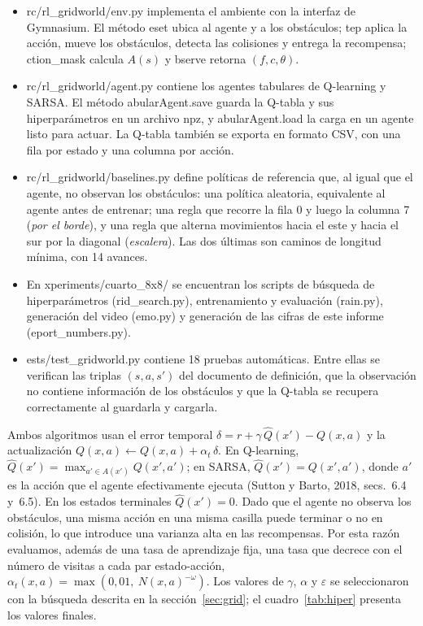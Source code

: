 \documentclass[11pt,letterpaper]{article}
\makeatletter
\newcommand{\code}[1]{{\ttfamily\codebreaks#1\endcodebreaks}}
\def\codebreaks#1\endcodebreaks{\@codebreaks#1\@nil}
\def\@codebreaks#1{\ifx#1\@nil\else\ifx#1/\slash\else\ifx#1\_\_\allowbreak\else#1\fi\fi\expandafter\@codebreaks\fi}
\makeatother
\begin{document}
\begin{itemize}
  \item \code{src/rl\_gridworld/env.py} implementa el ambiente con la interfaz de Gymnasium. El método
    \code{reset} ubica al agente y a los obstáculos; \code{step} aplica la acción, mueve los obstáculos, detecta
    las colisiones y entrega la recompensa; \code{action\_mask} calcula $A(s)$ y \code{observe} retorna
    $(f,c,\theta)$.
  \item \code{src/rl\_gridworld/agent.py} contiene los agentes tabulares de Q-learning y SARSA. El método
    \code{TabularAgent.save} guarda la Q-tabla y sus hiperparámetros en un archivo \code{.npz}, y
    \code{TabularAgent.load} la carga en un agente listo para actuar. La Q-tabla también se exporta en formato
    CSV, con una fila por estado y una columna por acción.
  \item \code{src/rl\_gridworld/baselines.py} define políticas de referencia que, al igual que el agente, no
    observan los obstáculos: una política aleatoria, equivalente al agente antes de entrenar; una regla que
    recorre la fila 0 y luego la columna 7 (\emph{por el borde}), y una regla que alterna movimientos hacia el
    este y hacia el sur por la diagonal (\emph{escalera}). Las dos últimas son caminos de longitud mínima, con
    14 avances.
  \item En \code{experiments/cuarto\_8x8/} se encuentran los scripts de búsqueda de hiperparámetros
    (\code{grid\_search.py}), entrenamiento y evaluación (\code{train.py}), generación del video
    (\code{demo.py}) y generación de las cifras de este informe (\code{report\_numbers.py}).
  \item \code{tests/test\_gridworld.py} contiene 18 pruebas automáticas. Entre ellas se verifican las triplas
    $(s,a,s')$ del documento de definición, que la observación no contiene información de los obstáculos y que
    la Q-tabla se recupera correctamente al guardarla y cargarla.
\end{itemize}

Ambos algoritmos usan el error temporal $\delta = r + \gamma\,\hat{Q}(x') - Q(x,a)$ y la actualización
$Q(x,a)\leftarrow Q(x,a)+\alpha_t\,\delta$. En Q-learning, $\hat{Q}(x')=\max_{a'\in A(x')}Q(x',a')$; en SARSA,
$\hat{Q}(x')=Q(x',a')$, donde $a'$ es la acción que el agente efectivamente ejecuta (Sutton y Barto, 2018,
secs.~6.4 y~6.5). En los estados terminales $\hat{Q}(x')=0$. Dado que el agente no observa los obstáculos, una
misma acción en una misma casilla puede terminar o no en colisión, lo que introduce una varianza alta en las
recompensas. Por esta razón evaluamos, además de una tasa de aprendizaje fija, una tasa que decrece con el número
de visitas a cada par estado-acción, $\alpha_t(x,a)=\max(0{,}01,\ N(x,a)^{-\omega})$. Los valores de $\gamma$,
$\alpha$ y $\varepsilon$ se seleccionaron con la búsqueda descrita en la sección~\ref{sec:grid}; el
cuadro~\ref{tab:hiper} presenta los valores finales.
\end{document}
